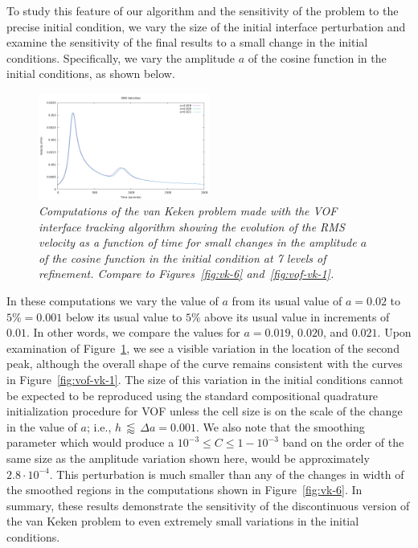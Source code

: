 To study this feature of our algorithm and the sensitivity of the problem to
the precise initial condition, we vary the size of the initial interface
perturbation and examine the sensitivity of the final results to a small change
in the initial conditions.
Specifically, we vary the amplitude $a$ of the cosine function in the initial conditions, as 
shown below.



\begin{figure}[htb]
    \centering
    \includegraphics[width=0.5\textwidth]{cookbooks/van-keken-vof/doc/init_diff_rms_vel_comparison.png}
    \caption{\it Computations of the van Keken problem made with the VOF
        interface tracking algorithm showing the evolution of the RMS velocity
        as a function of time for small changes in the amplitude $a$ of the
        cosine function in the initial condition at 7 levels of refinement.
        Compare to Figures~\ref{fig:vk-6} and~\ref{fig:vof-vk-1}.
    }
    \label{fig:vof-vk-3}
\end{figure}

In these computations we vary the value of $a$ from its usual value of $a = 0.02$ to 
$5\% = 0.001$ below its usual value to $5\%$ above its usual value in increments of $0.01$.
In other words, we compare the values for $a =0.019$, $0.020$, and $0.021$.
Upon examination of Figure~\ref{fig:vof-vk-3}, we see a visible variation in the location of 
the second peak, although the overall shape of the curve remains consistent with the curves 
in Figure~\ref{fig:vof-vk-1}.
The size of this variation in the initial conditions cannot be expected to be reproduced using 
the standard compositional quadrature initialization procedure for VOF unless the cell size is on the scale 
of the change in the value of $a$; i.e., $h \, \lessapprox \, \Delta a = 0.001$.
We also note that the smoothing parameter which would produce a
$10^{-3}\leq C \leq 1 - 10^{-3}$ band on the order of the same size as the
amplitude variation shown here, would be approximately $2.8 \cdot 10^{-4}$.
This perturbation is much smaller than any of the changes in width of the smoothed regions in 
the computations shown in Figure~\ref{fig:vk-6}.
In summary, these results demonstrate the sensitivity of the discontinuous version of the van 
Keken problem to even extremely small variations in the initial conditions.
